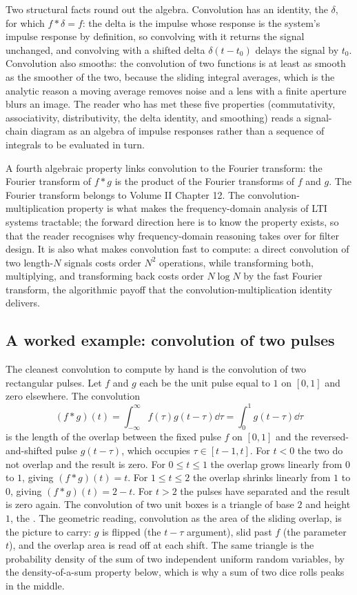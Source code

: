 Two structural facts round out the algebra. Convolution has an identity,
the  $\delta$, for which $f * \delta = f$: the delta
is the impulse whose response is the system's impulse response by
definition, so convolving with it returns the signal unchanged, and
convolving with a shifted delta $\delta(t - t_{0})$ delays the signal by
$t_{0}$. Convolution also smooths: the convolution of two functions is at
least as smooth as the smoother of the two, because the sliding integral
averages, which is the analytic reason a moving average removes noise and
a lens with a finite aperture blurs an image. The reader who has met
these five properties (commutativity, associativity, distributivity, the
delta identity, and smoothing) reads a signal-chain diagram as an algebra
of impulse responses rather than a sequence of integrals to be evaluated
in turn.

A fourth algebraic property links convolution to the Fourier transform:
the Fourier transform of $f * g$ is the product of the Fourier
transforms of $f$ and $g$. The Fourier transform belongs to Volume
II Chapter 12. The convolution-multiplication property is what
makes the frequency-domain analysis of LTI systems tractable; the
forward direction here is to know the property exists, so that the
reader recognises why frequency-domain reasoning takes over for
filter design. It is also what makes convolution fast to compute: a
direct convolution of two length-$N$ signals costs order $N^{2}$
operations, while transforming both, multiplying, and transforming back
costs order $N\log N$ by the fast Fourier transform, the algorithmic
payoff that the convolution-multiplication identity delivers.

\subsection{A worked example: convolution of two pulses}

The cleanest convolution to compute by hand is the convolution of
two rectangular pulses. Let $f$ and $g$ each be the unit pulse equal
to $1$ on $[0, 1]$ and zero elsewhere. The convolution
\[
(f * g)(t) = \int_{-\infty}^{\infty} f(\tau)g(t - \tau)\dd\tau =
\int_{0}^{1} g(t - \tau)\dd\tau
\]
is the length of the overlap between the fixed pulse $f$ on
$[0, 1]$ and the reversed-and-shifted pulse $g(t - \tau)$, which
occupies $\tau \in [t - 1, t]$. For $t < 0$ the two do not overlap
and the result is zero. For $0 \leq t \leq 1$ the overlap grows
linearly from $0$ to $1$, giving $(f * g)(t) = t$. For $1 \leq t
\leq 2$ the overlap shrinks linearly from $1$ to $0$, giving
$(f * g)(t) = 2 - t$. For $t > 2$ the pulses have separated and the
result is zero again. The convolution of two unit boxes is a
triangle of base $2$ and height $1$, the . The geometric reading, convolution as the area of the
sliding overlap, is the picture to carry: $g$ is flipped (the
$t - \tau$ argument), slid past $f$ (the parameter $t$), and the
overlap area is read off at each shift. The same triangle is the
probability density of the sum of two independent uniform random
variables, by the density-of-a-sum property below, which is why a
sum of two dice rolls peaks in the middle.

